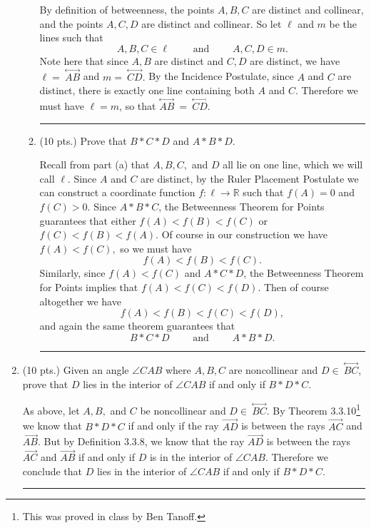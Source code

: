 \documentclass[12pt]{article}
\newcommand{\spand}{\qquad\text{ and }\qquad}
\newcommand{\R}{\mathbb R} %
\newcommand{\ray}[1]{\overrightarrow{#1}}
\renewcommand{\line}[1]{\stackrel{\longleftrightarrow}{#1}}
\newenvironment{proof}{\noindent {\bf Proof:}}{\hfill
\rule{1mm}{3mm} \bigskip}
\begin{document}
\begin{enumerate}
\begin{enumerate}
		\begin{proof} By definition of betweenness, the points $A,B,C$ are distinct and collinear, and the points $A,C,D$ are distinct and collinear. So let $\ell$ and $m$ be the lines such that
		$$A,B,C\in\ell \spand A,C,D\in m.$$ Note here that since $A,B$ are distinct and $C,D$ are distinct, we have $\ell =\ \line{AB}$ and $m=\ \line{CD}.$ By the Incidence Postulate, since $A$ and $C$ are distinct, there is exactly one line containing both $A$ and $C$. Therefore we must have $\ell = m$, so that $\line{AB} \ =\  \line{CD}$.  
	\end{proof}
	
	\item (10 pts.) Prove that $B \ast C \ast D$ and $A \ast B \ast D$.  
	
		\begin{proof} Recall from part (a) that $A,B,C,$ and $D$ all lie on one line, which we will call $\ell$. Since $A$ and $C$ are distinct, by the Ruler Placement Postulate we can construct a coordinate function $f:\ell \to \R$ such that $f(A)=0$ and $f(C)>0$. Since $A*B*C$, the Betweenness Theorem for Points guarantees that either $f(A) < f(B) < f(C)$ or $f(C)<f(B)<f(A).$ Of course in our construction we have $f(A) < f(C),$ so we must have $$f(A) < f(B) < f(C).$$ Similarly, since $f(A)<f(C)$ and $A*C*D$, the Betweenness Theorem for Points implies that $f(A) < f(C) < f(D).$ Then of course altogether we have $$f(A)<f(B)<f(C)<f(D),$$ and again the same theorem guarantees that $$B*C*D \spand A*B*D.$$\end{proof}
\end{enumerate}

\item (10 pts.) Given an angle $\angle CAB$ where $A,B,C$ are noncollinear and $D \in \ \line{BC}$, prove that $D$ lies in the interior of $\angle CAB$ if and only if $B \ast D \ast C$.  

	\begin{proof} As above, let $A,B,$ and $C$ be noncollinear and $D \in \ \line{BC}$. By Theorem 3.3.10\footnote{This was proved in class by Ben Tanoff.} we know that $B*D*C$ if and only if the ray $\ray{AD}$ is between the rays $\ray{AC}$ and $\ray{AB}$. But by Definition 3.3.8, we know that the ray $\ray{AD}$ is between the rays $\ray{AC}$ and $\ray{AB}$ if and only if $D$ is in the interior of $\angle CAB$.	Therefore we conclude that $D$ lies in the interior of $\angle CAB$ if and only if $B \ast D \ast C$. \end{proof} %
	

\end{enumerate}
\end{document}
